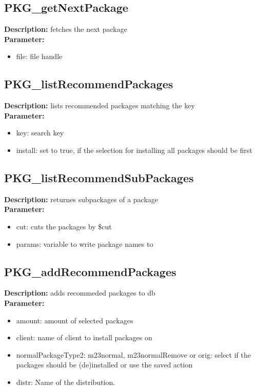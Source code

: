 \subsection{PKG\_getNextPackage}
\textbf{Description:} fetches the next package\\
\textbf{Parameter:}
\begin{itemize}
\item file: file handle
\end{itemize}

\subsection{PKG\_listRecommendPackages}
\textbf{Description:} lists recommended packages matching the key\\
\textbf{Parameter:}
\begin{itemize}
\item key: search key
\item install: set to true, if the selection for installing all packages should be first
\end{itemize}

\subsection{PKG\_listRecommendSubPackages}
\textbf{Description:} returnes subpackages of a package\\
\textbf{Parameter:}
\begin{itemize}
\item cut: cuts the packages by \$cut
\item params: variable to write package names to
\end{itemize}

\subsection{PKG\_addRecommendPackages}
\textbf{Description:} adds recommeded packages to db\\
\textbf{Parameter:}
\begin{itemize}
\item amount: amount of selected packages
\item client: name of client to install packages on
\item normalPackageType2: m23normal, m23normalRemove or orig: select if the packages should be (de)installed or use the saved action
\item distr: Name of the distribution.
\end{itemize}

